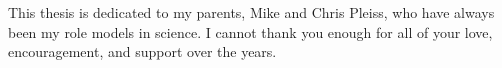 This thesis is dedicated to my parents, Mike and Chris Pleiss, who have always been my role models in science.
I cannot thank you enough for all of your love, encouragement, and support over the years.

